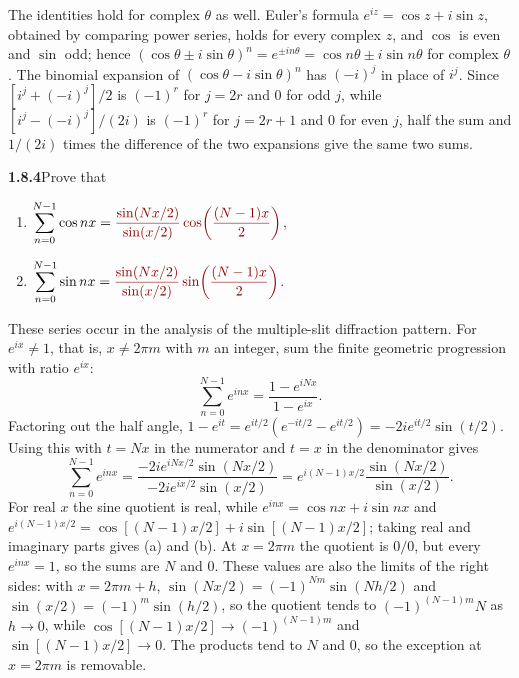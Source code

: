The identities hold for complex $\theta$ as well. Euler's formula
$e^{iz}=\cos z+i\sin z$, obtained by comparing power series, holds for
every complex $z$, and $\cos$ is even and $\sin$ odd; hence
$(\cos\theta\pm i\sin\theta)^n=e^{\pm in\theta}
=\cos n\theta\pm i\sin n\theta$ for complex $\theta$. The binomial
expansion of $(\cos\theta-i\sin\theta)^n$ has $(-i)^j$ in place of
$i^j$. Since $[i^j+(-i)^j]/2$ is $(-1)^r$ for $j=2r$ and $0$ for odd
$j$, while $[i^j-(-i)^j]/(2i)$ is $(-1)^r$ for $j=2r+1$ and $0$ for
even $j$, half the sum and $1/(2i)$ times the difference of the two
expansions give the same two sums.


\par\bigskip
\noindent\textbf{1.8.4}\quad Prove that
\begin{enumerate}
\item[(a)] $\displaystyle\sum_{n=0}^{N-1}\cos nx=\erratum{\frac{\sin(Nx/2)}{\sin(x/2)}\cos\!\left(\frac{(N-1)x}{2}\right)}$,
\item[(b)] $\displaystyle\sum_{n=0}^{N-1}\sin nx=\erratum{\frac{\sin(Nx/2)}{\sin(x/2)}\sin\!\left(\frac{(N-1)x}{2}\right)}$.
\end{enumerate}
 These series occur in the analysis of the multiple-slit diffraction pattern.
\solution
{}
For $e^{ix}\ne1$, that is, $x\ne2\pi m$ with $m$ an integer, sum the
finite geometric progression with ratio $e^{ix}$:
\[
 \sum_{n=0}^{N-1}e^{inx}=\frac{1-e^{iNx}}{1-e^{ix}}.
\]
Factoring out the half angle,
$1-e^{it}=e^{it/2}(e^{-it/2}-e^{it/2})=-2i e^{it/2}\sin(t/2)$.
Using this with $t=Nx$ in the numerator and $t=x$ in the denominator
gives
\[
 \sum_{n=0}^{N-1}e^{inx}
 =\frac{-2ie^{iNx/2}\sin(Nx/2)}{-2ie^{ix/2}\sin(x/2)}
 =e^{i(N-1)x/2}\frac{\sin(Nx/2)}{\sin(x/2)}.
\]
For real $x$ the sine quotient is real, while
$e^{inx}=\cos nx+i\sin nx$ and
$e^{i(N-1)x/2}=\cos[(N-1)x/2]+i\sin[(N-1)x/2]$; taking real and
imaginary parts gives (a) and (b). At $x=2\pi m$ the quotient is
$0/0$, but every $e^{inx}=1$, so the sums are $N$ and $0$. These values
are also the limits of the right sides: with $x=2\pi m+h$,
$\sin(Nx/2)=(-1)^{Nm}\sin(Nh/2)$ and $\sin(x/2)=(-1)^m\sin(h/2)$, so
the quotient tends to $(-1)^{(N-1)m}N$ as $h\to0$, while
$\cos[(N-1)x/2]\to(-1)^{(N-1)m}$ and $\sin[(N-1)x/2]\to0$. The products
tend to $N$ and $0$, so the exception at $x=2\pi m$ is removable.

